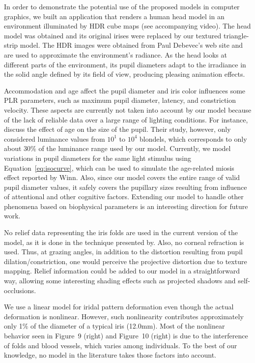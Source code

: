 \documentclass{acmtog} %
\begin{document}
In order to demonstrate the potential use of the proposed models in
computer graphics, we built an application that renders a human head
model in an environment illuminated by HDR cube maps (see accompanying
video). The head model was obtained and its original irises were
replaced by our textured triangle-strip model. The HDR images were
obtained from Paul Debevec's web site and are used to approximate the
environment's radiance. As the head looks at different parts of the
environment, its pupil diameters adapt to the irradiance in the solid
angle defined by its field of view, producing pleasing animation
effects.

Accommodation and age affect the pupil diameter and iris color
influences some PLR parameters, such as {maximum} pupil diameter,
latency, and constriction velocity. These aspects are currently not
taken into account by our model because of the lack of reliable data
over a large range of lighting conditions. For instance, discuss the
effect of age on the size of the pupil. Their study, however, only
considered luminance values from $10^1$ to $10^4$ blondels, which
corresponds to only about 30\% of the luminance range used by our model.
Currently, we model variations in pupil diameters for the same light
stimulus using Equation~\ref{eq:isocurve}, which can be used to simulate
the age-related miosis effect reported by Winn. Also, since our model
covers the entire range of valid pupil diameter values, it safely covers
the pupillary sizes resulting from influence of attentional and other
cognitive factors. Extending our model to handle other phenomena based
on biophysical parameters is an interesting direction for future work.

No relief data representing the iris folds are used in the current
version of the model, as it is done in the technique presented by. Also,
no corneal refraction is used. Thus, at grazing angles, in addition to
the distortion resulting from pupil dilation/constriction, one would
perceive the projective distortion due to texture mapping. Relief
information could be added to our model in a straightforward way,
allowing some interesting shading effects such as projected shadows and
self-occlusions.

We use a linear model for iridal pattern deformation even though the
actual deformation is nonlinear. However, such nonlinearity contributes
approximately only 1\% of the diameter of a typical iris (12.0mm). Most
of the nonlinear behavior seen in Figure~9 (right) and Figure~10 (right)
is due to the interference of folds and blood vessels, which varies
among individuals. To the best of our knowledge, no model in the
literature takes those factors into account.
\end{document}

